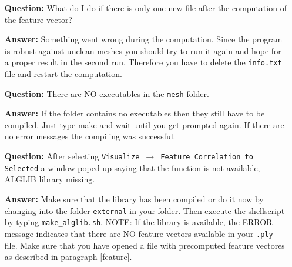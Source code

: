 \begin{enumerate}
\item[\bf Question:] What do I do if there is only one new file after the computation of the feature vector?

{\bf Answer:} Something went wrong during the computation. Since the program is robust against unclean meshes you should try to run it again and hope for a proper result in the second run. Therefore you have to delete the {\tt *info.txt} file and restart the computation. 

\item[\bf Question:] There are NO executables in the {\tt mesh} folder.

{\bf Answer:} If the folder contains no executables then they still have to be compiled. Just type make and wait until you get prompted again. If there are no error messages the compiling was successful.

\item[\bf Question:] After selecting \texttt{Visualize $\rightarrow$ Feature Correlation to Selected} a window poped up saying that the function is not available, ALGLIB library missing.

{\bf Answer:} Make sure that the library has been compiled or do it now by changing into the folder {\tt external} in your \GigaMesh folder. Then execute the shellscript by typing {\tt make\_alglib.sh}. NOTE: If the library is available, the ERROR message indicates that there are NO feature vectors available in your {\tt *.ply} file. Make sure that you have opened a file with precomputed feature vectores as described in paragraph \ref{feature}.

\end{enumerate}


